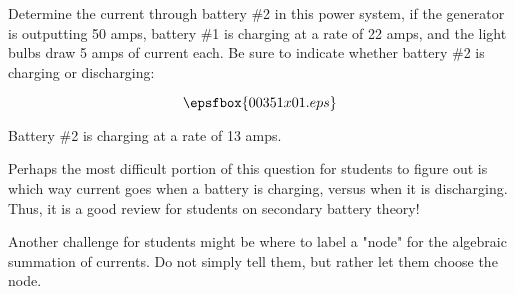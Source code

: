 

Determine the current through battery \#2 in this power system, if the generator is outputting 50 amps, battery \#1 is charging at a rate of 22 amps, and the light bulbs draw 5 amps of current each.  Be sure to indicate whether battery \#2 is charging or discharging:

$$\epsfbox{00351x01.eps}$$







Battery \#2 is charging at a rate of 13 amps.







Perhaps the most difficult portion of this question for students to figure out is which way current goes when a battery is charging, versus when it is discharging.  Thus, it is a good review for students on secondary battery theory!

Another challenge for students might be where to label a "node" for the algebraic summation of currents.  Do not simply tell them, but rather let them choose the node.




